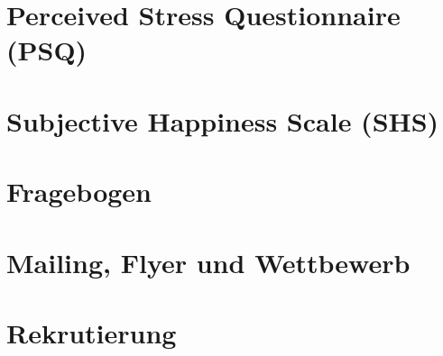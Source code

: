 \section{Perceived Stress Questionnaire (PSQ)}\label{app:PSQ}

\newpage

\section{Subjective Happiness Scale (SHS)}\label{app:SHS}

\newpage

\section{Fragebogen}\label{app:Fragebogen}

\newpage

\section{Mailing, Flyer und Wettbewerb}\label{app:Mailing}

\newpage

\section{Rekrutierung}\label{app:Rekrutierung}

\newpage





%
%
%